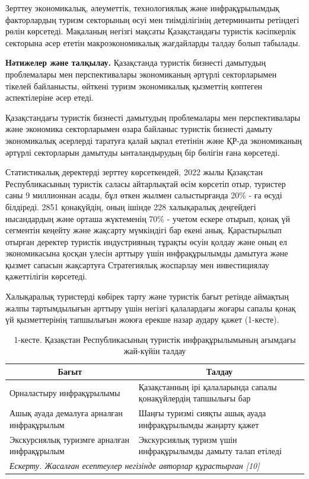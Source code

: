 \begin{multicols}{2}
Зерттеу экономикалық, әлеуметтік, технологиялық және инфрақұрылымдық
факторлардың туризм секторының өсуі мен тиімділігінің детерминанты
ретіндегі рөлін көрсетеді. Мақаланың негізгі мақсаты Қазақстандағы
туристік кәсіпкерлік секторына әсер ететін макроэкономикалық жағдайларды
талдау болып табылады.

{\bfseries Нәтижелер және талқылау.} Қазақстанда туристік бизнесті
дамытудың проблемалары мен перспективалары экономиканың әртүрлі
секторларымен тікелей байланысты, өйткені туризм экономикалық қызметтің
көптеген аспектілеріне әсер етеді.

Қазақстандағы туристік бизнесті дамытудың проблемалары мен
перспективалары және экономика секторларымен өзара байланыс туристік
бизнесті дамыту экономикалық әсерлерді таратуға қалай ықпал ететінін
және ҚР-да экономиканың әртүрлі секторларын дамытуды ынталандырудың бір
бөлігін ғана көрсетеді.

Статистикалық деректерді зерттеу көрсеткендей, 2022 жылы Қазақстан
Республикасының туристік саласы айтарлықтай өсім көрсетіп отыр, туристер
саны 9 миллионнан асады, бұл өткен жылмен салыстырғанда 20\% - ға өсуді
білдіреді. 2851 қонақүйдің, оның ішінде 228 халықаралық деңгейдегі
нысандардың және орташа жүктеменің 70\% - учетом ескере отырып, қонақ үй
сегментін кеңейту және жақсарту мүмкіндігі бар екені анық. Қарастырылып
отырған деректер туристік индустрияның тұрақты өсуін қолдау және оның ел
экономикасына қосқан үлесін арттыру үшін инфрақұрылымды дамытуға және
қызмет сапасын жақсартуға Стратегиялық жоспарлау мен инвестициялау
қажеттілігін көрсетеді.

Халықаралық туристерді көбірек тарту және туристік бағыт ретінде
аймақтың жалпы тартымдылығын арттыру үшін негізгі қалалардағы жоғары
сапалы қонақ үй қызметтерінің тапшылығын жоюға ерекше назар аудару қажет
(1-кесте).
\end{multicols}

\begin{table}[H]
\caption*{1-кесте. Қазақстан Республикасының туристік инфрақұрылымының ағымдағы жай-күйін талдау}
\centering
\begin{tabular}{|p{}p{}|}
\hline
\multicolumn{1}{|c|}{Бағыт}                      & \multicolumn{1}{c|}{Талдау}                      \\ \hline
\multicolumn{1}{|p{0.45\textwidth}|}{Орналастыру инфрақұрылымы}                   & Қазақстанның ірі қалаларында сапалы қонақүйлердің тапшылығы бар \\ \hline
\multicolumn{1}{|p{0.45\textwidth}|}{Ашық ауада демалуға арналған инфрақұрылым}   & Шаңғы туризмі сияқты ашық ауада инфрақұрылымды жаңарту қажет    \\ \hline
\multicolumn{1}{|p{0.45\textwidth}|}{Экскурсиялық туризмге арналған инфрақұрылым} & Экскурсиялық туризм үшін инфрақұрылымды дамыту талап етіледі    \\ \hline
\multicolumn{2}{|l|}{\textit{Ескерту. Жасалған есептеулер негізінде авторлар құрастырған {[}10{]}}} \\ \hline
\end{tabular}%
\end{table}

